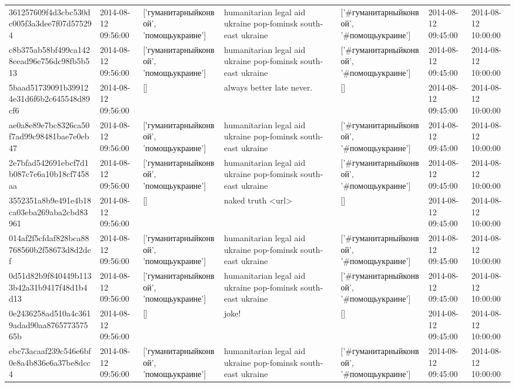 \begin{tabular}{lllllll}
361257609f4d3cbc530dc005f3a3dee7f07d575294 & 2014-08-12 09:56:00 & ['гуманитарныйконвой', 'помощьукраине'] & humanitarian legal aid ukraine pop-fominsk south-east ukraine & ['#гуманитарныйконвой', '#помощьукраине'] & 2014-08-12 09:45:00 & 2014-08-12 10:00:00 \\
c8b375ab58bf499ca1428eead96e756dc98fb5b513 & 2014-08-12 09:56:00 & ['гуманитарныйконвой', 'помощьукраине'] & humanitarian legal aid ukraine pop-fominsk south-east ukraine & ['#гуманитарныйконвой', '#помощьукраине'] & 2014-08-12 09:45:00 & 2014-08-12 10:00:00 \\
5baad51739091b399124e31d6f6b2c645548d89cf6 & 2014-08-12 09:56:00 & [] & always better late never. & [] & 2014-08-12 09:45:00 & 2014-08-12 10:00:00 \\
ae0a8e89e7bc8326ca50f7ad99c98481bae7e0eb47 & 2014-08-12 09:56:00 & ['гуманитарныйконвой', 'помощьукраине'] & humanitarian legal aid ukraine pop-fominsk south-east ukraine & ['#гуманитарныйконвой', '#помощьукраине'] & 2014-08-12 09:45:00 & 2014-08-12 10:00:00 \\
2e7bfad542691ebcf7d1b087c7e6a10b18cf7458aa & 2014-08-12 09:56:00 & ['гуманитарныйконвой', 'помощьукраине'] & humanitarian legal aid ukraine pop-fominsk south-east ukraine & ['#гуманитарныйконвой', '#помощьукраине'] & 2014-08-12 09:45:00 & 2014-08-12 10:00:00 \\
3552351a8b9e491e4b18ca03eba269aba2cbd83961 & 2014-08-12 09:56:00 & [] & naked truth <url> & [] & 2014-08-12 09:45:00 & 2014-08-12 10:00:00 \\
014af2f5cfdaf828bca88768560b2f58673d8d2dcf & 2014-08-12 09:56:00 & ['гуманитарныйконвой', 'помощьукраине'] & humanitarian legal aid ukraine pop-fominsk south-east ukraine & ['#гуманитарныйконвой', '#помощьукраине'] & 2014-08-12 09:45:00 & 2014-08-12 10:00:00 \\
0d51d82b9f840449b1133b42a31b9417f48d1b4d13 & 2014-08-12 09:56:00 & ['гуманитарныйконвой', 'помощьукраине'] & humanitarian legal aid ukraine pop-fominsk south-east ukraine & ['#гуманитарныйконвой', '#помощьукраине'] & 2014-08-12 09:45:00 & 2014-08-12 10:00:00 \\
0e2436258ad510a4c3619adad90aa876577357565b & 2014-08-12 09:56:00 & [] & joke! & [] & 2014-08-12 09:45:00 & 2014-08-12 10:00:00 \\
ebc73acaaf239c546e6bf0e8a4b836e6a37be8dcc4 & 2014-08-12 09:56:00 & ['гуманитарныйконвой', 'помощьукраине'] & humanitarian legal aid ukraine pop-fominsk south-east ukraine & ['#гуманитарныйконвой', '#помощьукраине'] & 2014-08-12 09:45:00 & 2014-08-12 10:00:00 \\

\end{tabular}

